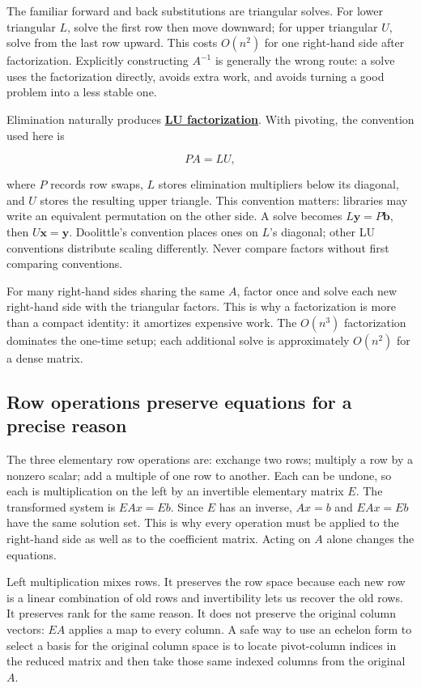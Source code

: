The familiar forward and back substitutions are triangular solves. For lower triangular \(L\), solve the first row then move downward; for upper triangular \(U\), solve from the last row upward. This costs \(O(n^2)\) for one right-hand side after factorization. Explicitly constructing \(A^{-1}\) is generally the wrong route: a solve uses the factorization directly, avoids extra work, and avoids turning a good problem into a less stable one.

Elimination naturally produces \textbf{\hyperref[01-foundations-i-ch019-a-runnable-pivoted-lu-reference-preserves-the-elimination-history]{LU factorization}}. With pivoting, the convention used here is

\[
PA=LU,
\]

where \(P\) records row swaps, \(L\) stores elimination multipliers below its diagonal, and \(U\) stores the resulting upper triangle. This convention matters: libraries may write an equivalent permutation on the other side. A solve becomes \(L\mathbf y=P\mathbf b\), then \(U\mathbf x=\mathbf y\). Doolittle's convention places ones on \(L\)'s diagonal; other LU conventions distribute scaling differently. Never compare factors without first comparing conventions.

For many right-hand sides sharing the same \(A\), factor once and solve each new right-hand side with the triangular factors. This is why a factorization is more than a compact identity: it amortizes expensive work. The \(O(n^3)\) factorization dominates the one-time setup; each additional solve is approximately \(O(n^2)\) for a dense matrix.

\subsection{Row operations preserve equations for a precise reason}\label{01-foundations-i-ch019-row-operations-preserve-equations-for-a-precise-reason}

The three elementary row operations are: exchange two rows; multiply a row by a nonzero scalar; add a multiple of one row to another. Each can be undone, so each is multiplication on the left by an invertible elementary matrix \(E\). The transformed system is \(EAx=Eb\). Since \(E\) has an inverse, \(Ax=b\) and \(EAx=Eb\) have the same solution set. This is why every operation must be applied to the right-hand side as well as to the coefficient matrix. Acting on \(A\) alone changes the equations.

Left multiplication mixes rows. It preserves the row space because each new row is a linear combination of old rows and invertibility lets us recover the old rows. It preserves rank for the same reason. It does not preserve the original column vectors: \(EA\) applies a map to every column. A safe way to use an echelon form to select a basis for the original column space is to locate pivot-column indices in the reduced matrix and then take those same indexed columns from the original \(A\).

